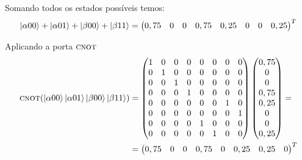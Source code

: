 Somando todos os estados possíveis temos:
\begin{equation}
\ket{\alpha00}+\ket{\alpha01}+\ket{\beta00}+\ket{\beta11}= \begin{pmatrix}
0,75 & 0 & 0 & 0,75 & 0,25 & 0 & 0 & 0,25
\end{pmatrix}^T
\end{equation}

Aplicando a porta \(\operatorname{\textsc{cnot}}\)
\begin{equation}
\begin{split}
		\operatorname{\textsc{cnot}} (\ket{\alpha00}\ket{\alpha01}\ket{\beta00}\ket{\beta11}) &= \begin{pmatrix}
		1 & 0 & 0 & 0 & 0 & 0 & 0 & 0 \\
		0 & 1 & 0 & 0 & 0 & 0 & 0 & 0 \\
		0 & 0 & 1 & 0 & 0 & 0 & 0 & 0 \\
		0 & 0 & 0 & 1 & 0 & 0 & 0 & 0 \\
		0 & 0 & 0 & 0 & 0 & 0 & 1 & 0 \\
		0 & 0 & 0 & 0 & 0 & 0 & 0 & 1 \\
		0 & 0 & 0 & 0 & 1 & 0 & 0 & 0 \\
		0 & 0 & 0 & 0 & 0 & 1 & 0 & 0 		
		\end{pmatrix} \begin{pmatrix}
		0,75 \\
		0 \\
		0 \\
		0,75 \\
		0,25 \\
		0 \\
		0 \\
		0,25
		\end{pmatrix} = \\
		&=\begin{pmatrix}
		0,75 & 0 &	0 & 0,75 &	0 &	0,25 &	0,25 &	0
		\end{pmatrix}^T
	\end{split}
\end{equation}	
	
